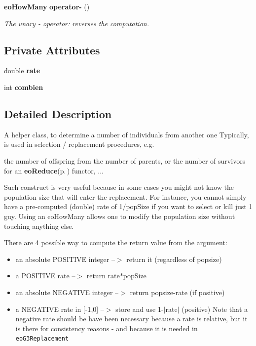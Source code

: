 \begin{CompactItemize}
\item 
{\bf eo\-How\-Many} {\bf operator-} ()\label{classeo_how_many_a8}

\begin{CompactList}\small\item\em The unary - operator: reverses the computation. \item\end{CompactList}\end{CompactItemize}
\subsection*{Private Attributes}
\begin{CompactItemize}
\item 
double {\bf rate}\label{classeo_how_many_r0}

\item 
int {\bf combien}\label{classeo_how_many_r1}

\end{CompactItemize}


\subsection{Detailed Description}
A helper class, to determine a number of individuals from another one Typically, is used in selection / replacement procedures, e.g. 

the number of offspring from the number of parents, or the number of survivors for an {\bf eo\-Reduce}{\rm (p.\,\pageref{classeo_reduce})} functor, ...

Such construct is very useful because in some cases you might not know the population size that will enter the replacement. For instance, you cannot simply have a pre-computed (double) rate of 1/pop\-Size if you want to select or kill just 1 guy. Using an eo\-How\-Many allows one to modify the population size without touching anything else.

There are 4 possible way to compute the return value from the argument:\begin{itemize}
\item an absolute POSITIVE integer --$>$ return it (regardless of popsize)\item a POSITIVE rate --$>$ return rate$\ast$pop\-Size\item an absolute NEGATIVE integer --$>$ return popsize-rate (if positive)\item a NEGATIVE rate in [-1,0] --$>$ store and use 1-$|$rate$|$ (positive) Note that a negative rate should be have been necessary because a rate is relative, but it is there for consistency reasons - and because it is needed in {\tt eo\-G3Replacement}\end{itemize}


